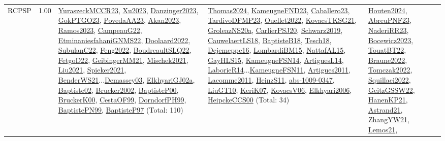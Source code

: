 {\begin{longtable}{p{3cm}r>{\raggedright\arraybackslash}p{6cm}>{\raggedright\arraybackslash}p{6cm}>{\raggedright\arraybackslash}p{8cm}}
\index{RCPSP}\index{Classification!RCPSP}RCPSP &  1.00 & \hyperref[detail:YuraszeckMCCR23]{YuraszeckMCCR23}, \hyperref[detail:Xu2023]{Xu2023}, \hyperref[detail:Danzinger2023]{Danzinger2023}, \hyperref[detail:GokPTGO23]{GokPTGO23}, \hyperref[detail:PovedaAA23]{PovedaAA23}, \hyperref[detail:Akan2023]{Akan2023}, \hyperref[detail:Ramos2023]{Ramos2023}, \hyperref[detail:CampeauG22]{CampeauG22}, \hyperref[detail:EtminaniesfahaniGNMS22]{EtminaniesfahaniGNMS22}, \hyperref[detail:Doolaard2022]{Doolaard2022}, \hyperref[detail:SubulanC22]{SubulanC22}, \hyperref[detail:Feng2022]{Feng2022}, \hyperref[detail:BoudreaultSLQ22]{BoudreaultSLQ22}, \hyperref[detail:FetgoD22]{FetgoD22}, \hyperref[detail:GeibingerMM21]{GeibingerMM21}, \hyperref[detail:Mischek2021]{Mischek2021}, \hyperref[detail:Liu2021]{Liu2021}, \hyperref[detail:Spieker2021]{Spieker2021}, \hyperref[detail:BenderWS21]{BenderWS21}...\hyperref[detail:Demassey03]{Demassey03}, \hyperref[detail:ElkhyariGJ02a]{ElkhyariGJ02a}, \hyperref[detail:Baptiste02]{Baptiste02}, \hyperref[detail:Brucker2002]{Brucker2002}, \hyperref[detail:BaptisteP00]{BaptisteP00}, \hyperref[detail:BruckerK00]{BruckerK00}, \hyperref[detail:CestaOF99]{CestaOF99}, \hyperref[detail:DorndorfPH99]{DorndorfPH99}, \hyperref[detail:BaptistePN99]{BaptistePN99}, \hyperref[detail:BaptisteP97]{BaptisteP97} (Total: 110) & \hyperref[detail:Thomas2024]{Thomas2024}, \hyperref[detail:KameugneFND23]{KameugneFND23}, \hyperref[detail:Caballero23]{Caballero23}, \hyperref[detail:TardivoDFMP23]{TardivoDFMP23}, \hyperref[detail:Ouellet2022]{Ouellet2022}, \hyperref[detail:KovacsTKSG21]{KovacsTKSG21}, \hyperref[detail:GroleazNS20a]{GroleazNS20a}, \hyperref[detail:CarlierPSJ20]{CarlierPSJ20}, \hyperref[detail:Schwarz2019]{Schwarz2019}, \hyperref[detail:CauwelaertLS18]{CauwelaertLS18}, \hyperref[detail:BaptisteB18]{BaptisteB18}, \hyperref[detail:Tesch18]{Tesch18}, \hyperref[detail:Dejemeppe16]{Dejemeppe16}, \hyperref[detail:LombardiBM15]{LombardiBM15}, \hyperref[detail:NattafAL15]{NattafAL15}, \hyperref[detail:GayHLS15]{GayHLS15}, \hyperref[detail:KameugneFSN14]{KameugneFSN14}, \hyperref[detail:ArtiguesL14]{ArtiguesL14}, \hyperref[detail:LaborieR14]{LaborieR14}...\hyperref[detail:KameugneFSN11]{KameugneFSN11}, \hyperref[detail:Artigues2011]{Artigues2011}, \hyperref[detail:Lacomme2011]{Lacomme2011}, \hyperref[detail:HeinzS11]{HeinzS11}, \hyperref[detail:abs-1009-0347]{abs-1009-0347}, \hyperref[detail:LiuGT10]{LiuGT10}, \hyperref[detail:KeriK07]{KeriK07}, \hyperref[detail:KovacsV06]{KovacsV06}, \hyperref[detail:Elkhyari2006]{Elkhyari2006}, \hyperref[detail:HeipckeCCS00]{HeipckeCCS00} (Total: 34) & \hyperref[detail:Houten2024]{Houten2024}, \hyperref[detail:AbreuPNF23]{AbreuPNF23}, \hyperref[detail:NaderiRR23]{NaderiRR23}, \hyperref[detail:Bocewicz2023]{Bocewicz2023}, \hyperref[detail:TouatBT22]{TouatBT22}, \hyperref[detail:Braune2022]{Braune2022}, \hyperref[detail:Tomczak2022]{Tomczak2022}, \hyperref[detail:Squillaci2022]{Squillaci2022}, \hyperref[detail:GeitzGSSW22]{GeitzGSSW22}, \hyperref[detail:HanenKP21]{HanenKP21}, \hyperref[detail:Astrand21]{Astrand21}, \hyperref[detail:ZhangYW21]{ZhangYW21}, \hyperref[detail:Lemos21]{Lemos21}, 
\end{longtable}}
